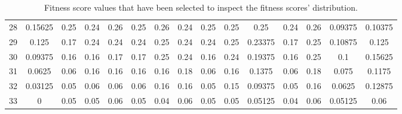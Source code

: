 \begin{appendices}
\begin{table}[!h]
{{\begin{tabular}{l||c|c|c|c|c|c|c|c|c||c|c|c||c|c}
 	 28 & 0.15625 & 0.25 & 0.24 & 0.26 & 0.25 & 0.26 & 0.24 & 0.25 & 0.25  &  0.25 & 0.24 & 0.26  &  0.09375 & 0.10375\\
 	 29 & 0.125 & 0.17 & 0.24 & 0.24 & 0.24 & 0.25 & 0.24 & 0.24 & 0.25  &  0.23375 & 0.17 & 0.25  &  0.10875 & 0.125\\
 	 30 & 0.09375 & 0.16 & 0.16 & 0.17 & 0.17 & 0.25 & 0.24 & 0.16 & 0.24  &  0.19375 & 0.16 & 0.25  &  0.1 & 0.15625\\
 	 31 & 0.0625 & 0.06 & 0.16 & 0.16 & 0.16 & 0.16 & 0.18 & 0.06 & 0.16  &  0.1375 & 0.06 & 0.18  &  0.075 & 0.1175\\
 	 32 & 0.03125 & 0.05 & 0.06 & 0.06 & 0.06 & 0.16 & 0.16 & 0.05 & 0.15  &  0.09375 & 0.05 & 0.16  &  0.0625 & 0.12875\\
 	 33 & 0 & 0.05 & 0.05 & 0.06 & 0.05 & 0.04 & 0.06 & 0.05 & 0.05  &  0.05125 & 0.04 & 0.06  &  0.05125 & 0.06\\
  \end{tabular}
}}
\caption[Fitness Score Distribution (Raw Test Data)]{Fitness score values that have been selected to inspect the fitness scores' distribution.}
\end{table}


\end{appendices}

